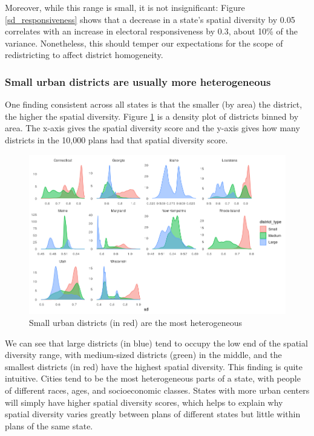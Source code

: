 \documentclass[]{article}
\begin{document}
Moreover, while this range is small, it is not insignificant: Figure
\ref{sd_responsiveness} shows that a decrease in a state's spatial
diversity by 0.05 correlates with an increase in electoral
responsiveness by 0.3, about 10\% of the variance. Nonetheless, this
should temper our expectations for the scope of redistricting to affect
district homogeneity.

\hypertarget{small-urban-districts-are-usually-more-heterogeneous}{%
\subsubsection{Small urban districts are usually more
heterogeneous}\label{small-urban-districts-are-usually-more-heterogeneous}}

One finding consistent across all states is that the smaller (by area)
the district, the higher the spatial diversity. Figure
\ref{pairwise_plot} is a density plot of districts binned by area. The
x-axis gives the spatial diversity score and the y-axis gives how many
districts in the 10,000 plans had that spatial diversity score.

\begin{figure}
\centering
\includegraphics{../30_results/size_and_sd.png}
\caption{Small urban districts (in red) are the most heterogeneous
\label{pairwise_plot}}
\end{figure}

We can see that large districts (in blue) tend to occupy the low end of
the spatial diversity range, with medium-sized districts (green) in the
middle, and the smallest districts (in red) have the highest spatial
diversity. This finding is quite intuitive. Cities tend to be the most
heterogeneous parts of a state, with people of different races, ages,
and socioeconomic classes. States with more urban centers will simply
have higher spatial diversity scores, which helps to explain why spatial
diversity varies greatly between plans of different states but little
within plans of the same state.
\end{document}
